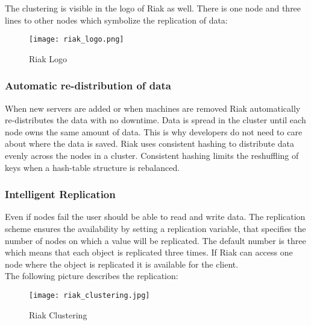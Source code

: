 The clustering is visible in the logo of Riak as well. There is one node and three lines to other nodes which symbolize the replication of data:
\begin{figure}[h!]
	\centering
	\texttt{[image: riak\_logo.png]}
	\caption[Riak Logo \protect\cite{Basho.06.04.2017}]{Riak Logo \protect\cite{Basho.06.04.2017}}
	\label{Riak Logo}
\end{figure}

\subsubsection{Automatic re-distribution of data}
When new servers are added or when machines are removed Riak automatically re-distributes the data with no downtime. Data is spread in the cluster until each node owns the same amount of data. This is why developers do not need to care about where the data is saved. Riak uses consistent hashing to distribute data evenly across the nodes in a cluster. Consistent hashing limits the reshuffling of keys when a hash-table structure is rebalanced. \cite{Basho.06.04.2017}
\subsubsection{Intelligent Replication}
Even if nodes fail the user should be able to read and write data. The replication scheme ensures the availability by setting a replication variable, that specifies the number of nodes on which a value will be replicated. The default number is three which means that each object is replicated three times. If Riak can access one node where the object is replicated it is available for the client. \cite{Basho.06.04.2017}
\\ 
The following picture describes the replication: 
\begin{figure}[h]
	\centering
	\texttt{[image: riak\_clustering.jpg]}
	\caption{Riak Clustering}
	\label{Riak Clustering}
\end{figure}